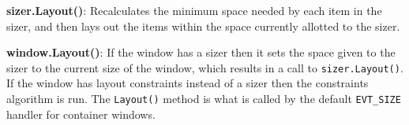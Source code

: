 {\bf sizer.Layout()}: Recalculates the minimum space needed by each
item in the sizer, and then lays out the items within the space
currently allotted to the sizer.

{\bf window.Layout()}: If the window has a sizer then it sets the
space given to the sizer to the current size of the window, which
results in a call to \texttt{sizer.Layout()}. If the window has layout
constraints instead of a sizer then the constraints algorithm is
run. The \texttt{Layout()} method is what is called by the default
\texttt{EVT\_SIZE} handler for container windows.




